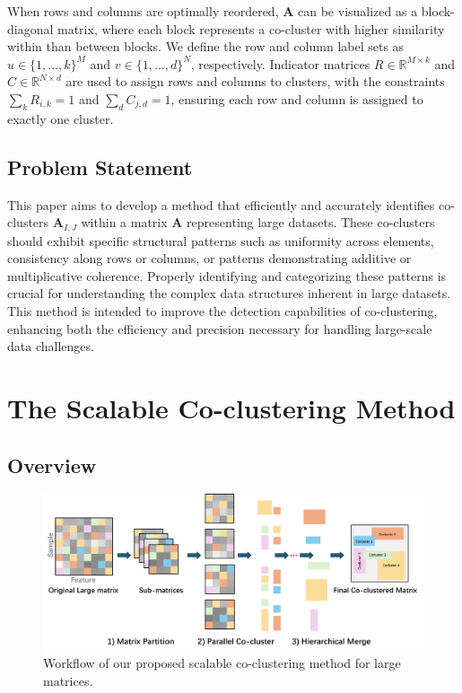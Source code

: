 \documentclass[journal]{IEEEtran}
\begin{document}
When rows and columns are optimally reordered, $\mathbf{A}$ can be visualized as a block-diagonal matrix, where each block represents a co-cluster with higher similarity within than between blocks. We define the row and column label sets as \( u \in \{1,\dots,k\}^M \) and \( v \in \{1,\dots,d\}^N \), respectively. Indicator matrices \( R \in \mathbb{R}^{M \times k} \) and \( C \in \mathbb{R}^{N \times d} \) are used to assign rows and columns to clusters, with the constraints \( \sum_k R_{i,k} = 1 \) and \( \sum_d C_{j,d} = 1 \), ensuring each row and column is assigned to exactly one cluster.

\subsection{Problem Statement}
This paper aims to develop a method that efficiently and accurately identifies co-clusters $\mathbf{A}_{I, J}$ within a matrix $\mathbf{A}$ representing large datasets. These co-clusters should exhibit specific structural patterns such as uniformity across elements, consistency along rows or columns, or patterns demonstrating additive or multiplicative coherence. Properly identifying and categorizing these patterns is crucial for understanding the complex data structures inherent in large datasets. This method is intended to improve the detection capabilities of co-clustering, enhancing both the efficiency and precision necessary for handling large-scale data challenges.

\section{The Scalable Co-clustering Method}
\label{sec:method}
\subsection{Overview}

\begin{figure}[htbp]
  \centering
  \includegraphics[width=0.8\linewidth]{workflow.png}
  \caption{Workflow of our proposed scalable co-clustering method for large matrices.}
  \label{fig:workflow}
\end{figure}
\end{document}
